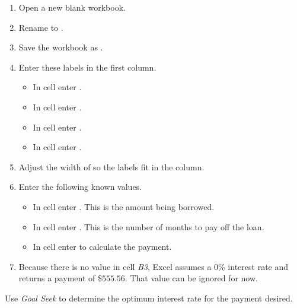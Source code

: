 \begin{enumbox}
	\begin{enumerate}
		\item Open a new blank workbook.
		\item Rename  to .
		\item Save the workbook as .
		\item Enter these labels in the first column.
	
		\begin{itemize}
			\item In cell  enter .
			\item In cell  enter .
			\item In cell  enter .
			\item In cell  enter .
		\end{itemize}
	
		\item Adjust the width of  so the labels fit in the column.
		\item Enter the following known values.
	
		\begin{itemize}
			\item In cell  enter . This is the amount being borrowed.
			\item In cell  enter . This is the number of months to pay off the loan. 
			\item In cell  enter  to calculate the payment. 
		\end{itemize}
	
		\item Because there is no value in cell \textit{B3}, Excel assumes a $ 0 $\% interest rate and returns a payment of \$$ 555.56 $. That value can be ignored for now.
	\end{enumerate}
\end{enumbox}

Use \textit{Goal Seek} to determine the optimum interest rate for the payment desired.

